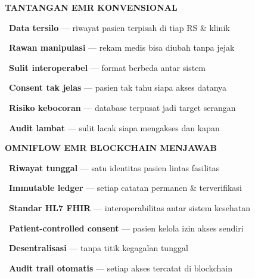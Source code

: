 \documentclass[a4paper]{article}
\begin{document}
\noindent
\begin{minipage}[t]{0.485\textwidth}
    \colorbox{RedLight}{%
        \begin{minipage}{\dimexpr\textwidth-2\fboxsep\relax}
            {\fontsize{10}{13}\selectfont\bfseries\color{RedText} TANTANGAN EMR KONVENSIONAL}
        \end{minipage}}\par
    \vspace{4pt}

    {\fontsize{9.5}{13}\selectfont\color{TextDark}%
    \textbullet\ \textbf{Data tersilo} — riwayat pasien terpisah di tiap RS \& klinik\par\vspace{4pt}%
    \textbullet\ \textbf{Rawan manipulasi} — rekam medis bisa diubah tanpa jejak\par\vspace{4pt}%
    \textbullet\ \textbf{Sulit interoperabel} — format berbeda antar sistem\par\vspace{4pt}%
    \textbullet\ \textbf{Consent tak jelas} — pasien tak tahu siapa akses datanya\par\vspace{4pt}%
    \textbullet\ \textbf{Risiko kebocoran} — database terpusat jadi target serangan\par\vspace{4pt}%
    \textbullet\ \textbf{Audit lambat} — sulit lacak siapa mengakses dan kapan}%
\end{minipage}%
\hfill%
\begin{minipage}[t]{0.485\textwidth}
    \colorbox{BluePrimary}{%
        \begin{minipage}{\dimexpr\textwidth-2\fboxsep\relax}
            {\fontsize{10}{13}\selectfont\bfseries\color{White} OMNIFLOW EMR BLOCKCHAIN MENJAWAB}
        \end{minipage}}\par
    \vspace{4pt}

    {\fontsize{9.5}{13}\selectfont\color{TextDark}%
    \textbullet\ \textbf{Riwayat tunggal} — satu identitas pasien lintas fasilitas\par\vspace{4pt}%
    \textbullet\ \textbf{Immutable ledger} — setiap catatan permanen \& terverifikasi\par\vspace{4pt}%
    \textbullet\ \textbf{Standar HL7 FHIR} — interoperabilitas antar sistem kesehatan\par\vspace{4pt}%
    \textbullet\ \textbf{Patient-controlled consent} — pasien kelola izin akses sendiri\par\vspace{4pt}%
    \textbullet\ \textbf{Desentralisasi} — tanpa titik kegagalan tunggal\par\vspace{4pt}%
    \textbullet\ \textbf{Audit trail otomatis} — setiap akses tercatat di blockchain}%
\end{minipage}
\end{document}
